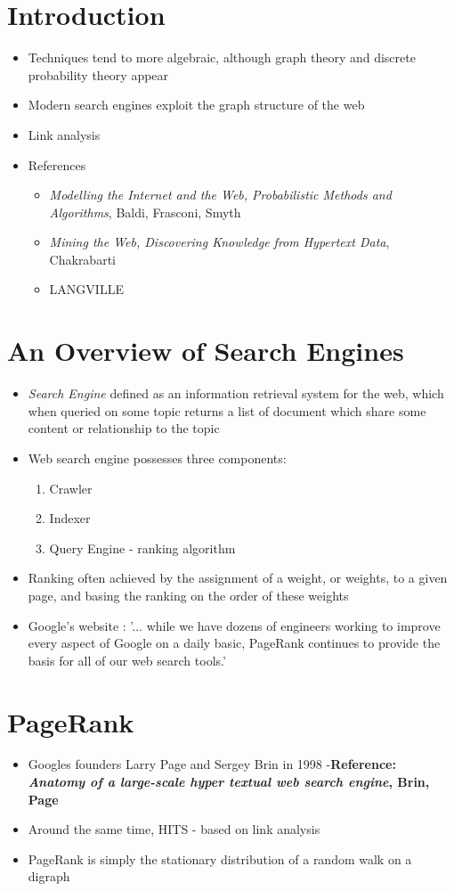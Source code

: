 \documentclass[11pt]{report}
\begin{document}
\section{Introduction}
\begin{itemize}
\item Techniques tend to more algebraic, although graph theory and discrete probability theory appear
\item Modern search engines exploit the graph structure of the web
\item Link analysis
\item References
\begin{itemize}
\item \textit{Modelling the Internet and the Web, Probabilistic Methods and Algorithms}, Baldi, Frasconi, Smyth
\item \textit{Mining the Web, Discovering Knowledge from Hypertext Data}, Chakrabarti
\item LANGVILLE
\end{itemize}
\end{itemize}
\section{An Overview of Search Engines}
\begin{itemize}
\item\textit{Search Engine} defined as an information retrieval system for the web, which when queried on some topic returns a list of document which share some content or relationship to the topic
\item Web search engine possesses three components:
\begin{enumerate}
\item Crawler
\item Indexer
\item Query Engine - ranking algorithm
\end{enumerate}
\item Ranking often achieved by the assignment of a weight, or weights, to a given page, and basing the ranking on the order of these weights
\item Google's website : '... while we have dozens of engineers working to improve every aspect of Google on a daily basic, PageRank continues to provide the basis for all of our web search tools.'
\end{itemize}
\section{PageRank}
\begin{itemize}
\item Googles founders Larry Page and Sergey Brin in 1998 -\textbf{Reference: \textit{Anatomy of a large-scale hyper textual web search engine}, Brin, Page}
\item Around the same time, HITS - based on link analysis
\item PageRank is simply the stationary distribution of a random walk on a digraph
\end{itemize}
\end{document}
